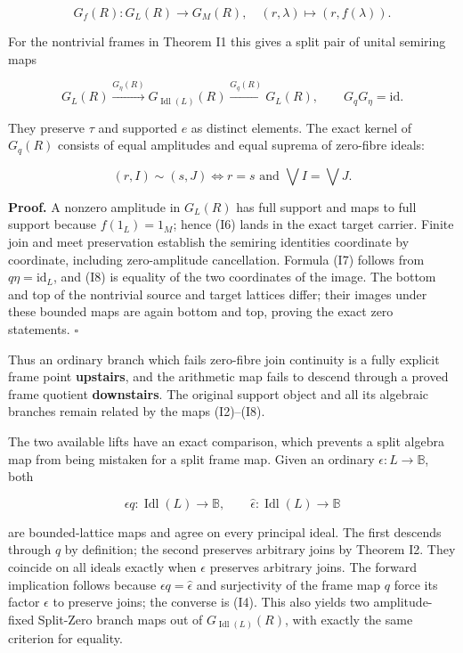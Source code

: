 \[
G_f(R):G_L(R)\to G_M(R),\quad (r,\lambda)\mapsto(r,f(\lambda)).
\tag{I6}
\]

For the nontrivial frames in Theorem I1 this gives a split pair of unital semiring maps

\[
G_L(R)\xrightarrow{G_\eta(R)}G_{\operatorname{Idl}(L)}(R)
\xrightarrow{G_q(R)}G_L(R),\qquad G_qG_\eta=\mathrm{id}.
\tag{I7}
\]

They preserve \(\tau\) and supported \(e\) as distinct elements. The exact kernel of \(G_q(R)\) consists of equal amplitudes and equal suprema of zero-fibre ideals:

\[
(r,I)\sim(s,J)\iff r=s\text{ and }\bigvee I=\bigvee J.
\tag{I8}
\]

\textbf{Proof.} A nonzero amplitude in \(G_L(R)\) has full support and maps to full support because \(f(1_L)=1_M\); hence (I6) lands in the exact target carrier. Finite join and meet preservation establish the semiring identities coordinate by coordinate, including zero-amplitude cancellation. Formula (I7) follows from \(q\eta=\mathrm{id}_L\), and (I8) is equality of the two coordinates of the image. The bottom and top of the nontrivial source and target lattices differ; their images under these bounded maps are again bottom and top, proving the exact zero statements. \(\square\)

Thus an ordinary branch which fails zero-fibre join continuity is a fully explicit frame point \textbf{upstairs}, and the arithmetic map fails to descend through a proved frame quotient \textbf{downstairs}. The original support object and all its algebraic branches remain related by the maps (I2)--(I8).

The two available lifts have an exact comparison, which prevents a split algebra map from being mistaken for a split frame map. Given an ordinary \(\epsilon :L\to \mathbb B\), both

\[
\epsilon q:\operatorname{Idl}(L)\to\mathbb B,
\qquad\widehat\epsilon:\operatorname{Idl}(L)\to\mathbb B
\tag{I9}
\]

are bounded-lattice maps and agree on every principal ideal. The first descends through \(q\) by definition; the second preserves arbitrary joins by Theorem I2. They coincide on all ideals exactly when \(\epsilon\) preserves arbitrary joins. The forward implication follows because \(\epsilon q=\widehat\epsilon\) and surjectivity of the frame map \(q\) force its factor \(\epsilon\) to preserve joins; the converse is (I4). This also yields two amplitude-fixed Split-Zero branch maps out of \(G_{\operatorname{Idl}(L)}(R)\), with exactly the same criterion for equality.

